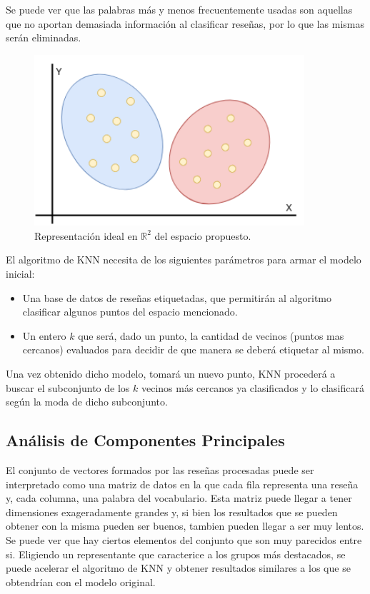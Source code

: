 Se puede ver que las palabras más y menos frecuentemente usadas son aquellas que no aportan demasiada información al clasificar reseñas, por lo que las mismas serán eliminadas.

\begin{figure}[H]
\begin{center}
\includegraphics[width=100mm]{img/cjtos.png}
\caption{Representación ideal en $\mathbb{R}^2$ del espacio propuesto.}
\label{intro::esp_vec}    
\end{center}
\end{figure}


El algoritmo de KNN necesita de los siguientes parámetros para armar el modelo inicial:
\begin{itemize}
\item Una base de datos de reseñas etiquetadas, que permitirán al algoritmo clasificar algunos puntos del espacio mencionado.
\item Un entero $k$ que será, dado un punto, la cantidad de vecinos (puntos mas cercanos) evaluados para decidir de que manera se deberá etiquetar al mismo.
\end{itemize}

Una vez obtenido dicho modelo, tomará un nuevo punto, KNN procederá a buscar el subconjunto de los $k$ vecinos más cercanos ya clasificados y lo clasificará según la moda de dicho subconjunto.

\subsection*{Análisis de Componentes Principales}\label{sec::intro::PCA}

El conjunto de vectores formados por las reseñas procesadas puede ser interpretado como una matriz de datos en la que cada fila representa una reseña y, cada columna, una palabra del vocabulario. Esta matriz puede llegar a tener dimensiones exageradamente grandes y, si bien los resultados que se pueden obtener con la misma pueden ser buenos, tambien pueden llegar a ser muy lentos. Se puede ver que hay ciertos elementos del conjunto que son muy parecidos entre si. Eligiendo un representante que caracterice a los grupos más destacados, se puede acelerar el algoritmo de KNN y obtener resultados similares a los que se obtendrían con el modelo original.\\

